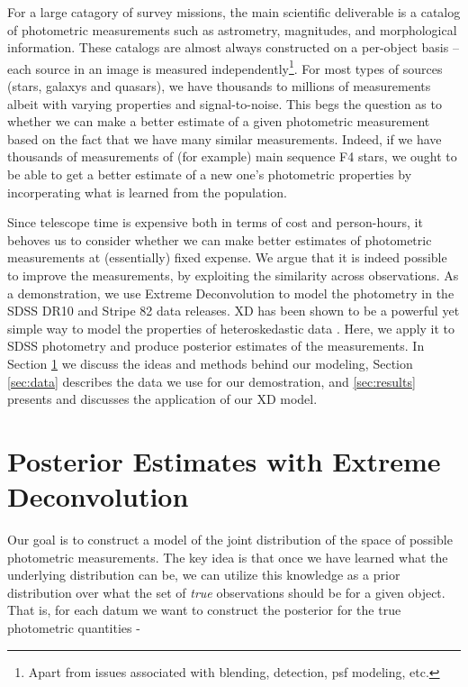 \documentclass[12pt,preprint]{aastex}
\begin{document}
For a large catagory of survey missions, the main scientific deliverable is a
catalog of photometric measurements such as astrometry, magnitudes, and
morphological information.  These catalogs are almost always constructed on a 
per-object basis -- each source in an image is measured 
independently\footnote{Apart from issues associated with blending, detection,
psf modeling, etc.}.
For most types of sources (stars, galaxys and quasars), we have thousands to
millions of measurements albeit with varying properties and signal-to-noise.
This begs the question as to whether we can make a better estimate of a given
photometric measurement based on the fact that we have many similar
measurements.  Indeed, if we have thousands of measurements of (for example)
main sequence F4 stars, we ought to be able to get a better estimate of a new 
one's photometric properties by incorperating what is learned from the
population. 

Since telescope time is expensive both in terms of cost and person-hours, it
behoves us to consider whether we can make better estimates of photometric 
measurements at (essentially) fixed expense.  We argue that it is indeed
possible to improve the measurements, by exploiting the similarity across
observations.  As a demonstration, we use Extreme Deconvolution
\citep[XD, ][]{bovy11} to model the photometry in the SDSS DR10 \citep{ahn14}
and
Stripe 82 \citep{annis14} data releases.  XD has been shown to be a powerful yet
simple way to model the properties of heteroskedastic data \citep{bovy10}.
Here, we apply it to SDSS photometry and produce posterior estimates of the 
measurements.  In Section \ref{sec:method} we discuss the ideas and methods 
behind our modeling, Section \ref{sec:data} describes the data we use for 
our demostration, and \ref{sec:results} presents and discusses the application
of our XD model.

%
%
\section{Posterior Estimates with Extreme Deconvolution}
\label{sec:method}

Our goal is to construct a model of the joint distribution of the space of
possible photometric measurements.  The key idea is that once we have learned
what the underlying distribution can be, we can utilize this knowledge as a
prior distribution over what the set of \emph{true} observations should be for
a given object.  That is, for each datum we want to construct the posterior
for the true photometric quantities -
\end{document}
